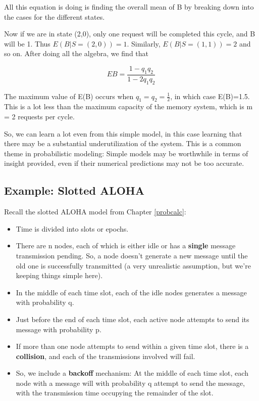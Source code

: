 All this equation is doing is finding the overall mean of B by breaking
down into the cases for the different states. 

Now if we are in state (2,0), only one request will be completed this
cycle, and B will be 1.  Thus $E(B|S=(2,0)) = 1$.  Similarly,
$E(B|S=(1,1)) = 2$ and so on.  After doing all the algebra, we find that

\begin{equation}
EB = \frac{1-q_{1}q_{2}}{1-2q_{1}q_{2}}
\end{equation}


The maximum value of E(B) occurs when $q_{1}=q_{2}=\frac{1}{2}$, in
which case E(B)=1.5. This is a lot less than the maximum capacity of the
memory system, which is m = 2 requests per cycle. 

So, we can learn a lot even from this simple model, in this case
learning that there may be a substantial underutilization of the system.
This is a common theme in probabilistic modeling:  Simple models may be
worthwhile in terms of insight provided, even if their numerical
predictions may not be too accurate.

\subsection{Example:  Slotted ALOHA}

Recall the slotted ALOHA model from Chapter \ref{probcalc}:

\begin{itemize}

\item Time is divided into slots or epochs.

\item There are n nodes, each of which is either idle or has a {\bf
single} message transmission pending.  So, a node doesn't generate a new
message until the old one is successfully transmitted (a very
unrealistic assumption, but we're keeping things simple here).

\item In the middle of each time slot, each of the idle nodes generates
a message with probability q.   

\item Just before the end of each time slot, each active node attempts
to send its message with probability p.

\item If more than one node attempts to send within a given time slot,
there is a \textbf{collision}, and each of the transmissions involved
will fail.  

\item So, we include a {\bf backoff} mechanism: At the middle of each
time slot, each node with a message will with probability q attempt to
send the message, with the transmission time occupying the remainder of
the slot.  

\end{itemize}

